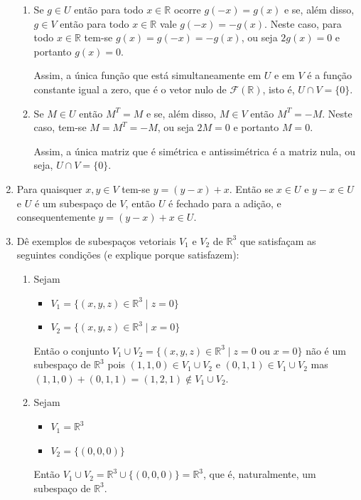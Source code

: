 \documentclass[12pt,a4paper]{article}
\newcommand*\R{\mathbb{R}}
\begin{document}
\begin{enumerate}
\begin{enumerate}
\item Se $g \in U$ então para todo $x \in \R$ ocorre $g(-x) = g(x)$ e se, além disso, $g \in V$ então para todo $x \in \R$ vale $g(-x) = -g(x)$. Neste caso, para todo $x \in \R$ tem-se $g(x) = g(-x) = -g(x)$, ou seja $2g(x) = 0$ e portanto $g(x) = 0$.

Assim, a única função que está simultaneamente em $U$ e em $V$ é a função constante igual a zero, que é o vetor nulo de $\mathcal{F}(\R)$, isto é, $U \cap V = \{ 0 \}$.

\item Se $M \in U$ então $M^T = M$ e se, além disso, $M \in V$ então $M^T = -M$. Neste caso, tem-se $M = M^T = -M$, ou seja $2M = 0$ e portanto $M = 0$.

Assim, a única matriz que é simétrica e antissimétrica é a matriz nula, ou seja, $U \cap V = \{ 0 \}$.
\end{enumerate}


\item Para quaisquer $x, y \in V$ tem-se $y = (y - x) + x$. Então se $x \in U$ e $y-x \in U$ e $U$ é um subespaço de $V$, então $U$ é fechado para a adição, e consequentemente $y = (y - x) + x \in U$.

\item Dê exemplos de subespaços vetoriais $V_1$ e $V_2$ de $\R^3$ que satisfaçam as seguintes condições (e explique porque satisfazem):
\begin{enumerate}
\item Sejam
\begin{itemize}
\item $V_1 = \{ (x,y,z) \in \R^3 \mid z=0 \}$
\item $V_2 = \{ (x,y,z) \in \R^3 \mid x=0 \}$
\end{itemize}
Então o conjunto $V_1 \cup V_2 = \{ (x,y,z) \in \R^3 \mid z=0 \text{ ou } x=0 \}$ não é um subespaço de $\R^3$ pois $(1,1,0) \in V_1 \cup V_2$ e $(0,1,1) \in V_1 \cup V_2$ mas $(1,1,0) + (0,1,1) = (1,2,1) \not \in V_1 \cup V_2$.

\item Sejam
\begin{itemize}
\item $V_1 = \R^3$
\item $V_2 = \{ (0,0,0) \}$
\end{itemize}
Então $V_1 \cup V_2 = \R^3 \cup \{ (0,0,0) \} = \R^3$, que é, naturalmente, um subespaço de $\R^3$.

\end{enumerate}



\end{enumerate}
\end{document}
